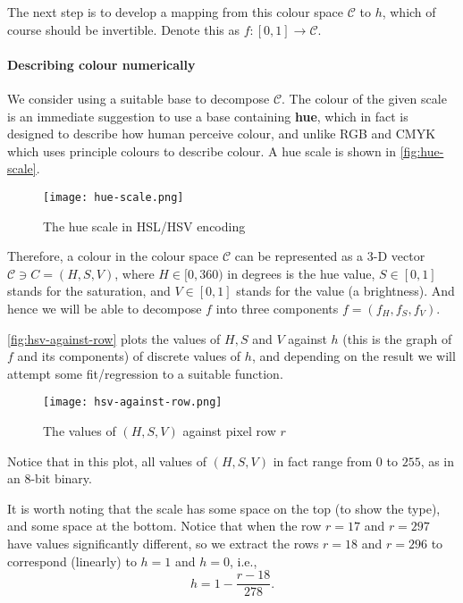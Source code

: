 The next step is to develop a mapping from this colour space \(\mathcal{C}\) to \(h\), which of course should be invertible. Denote this as \(f: [0, 1] \to \mathcal{C}\).

\paragraph{Describing colour numerically}

We consider using a suitable base to decompose \(\mathcal{C}\). The colour of the given scale is an immediate suggestion to use a base containing \textbf{hue}, which in fact is designed to describe how human perceive colour, and unlike RGB and CMYK which uses principle colours to describe colour. A hue scale is shown in \autoref{fig:hue-scale}.

\begin{figure}[htp]
    \centering
    \texttt{[image: hue-scale.png]}
    \caption{The hue scale in HSL/HSV encoding}
    \label{fig:hue-scale}
\end{figure}

Therefore, a colour in the colour space \(\mathcal{C}\) can be represented as a 3-D vector \(\mathcal{C} \ni C = (H, S, V)\), where \(H \in [0, 360)\) in degrees is the hue value, \(S \in [0, 1]\) stands for the saturation, and \(V \in [0, 1]\) stands for the value (a brightness). And hence we will be able to decompose \(f\) into three components \(f = \left(f_H, f_S, f_V\right)\).

\autoref{fig:hsv-against-row} plots the values of \(H, S\) and \(V\) against \(h\) (this is the graph of \(f\) and its components) of discrete values of \(h\), and depending on the result we will attempt some fit/regression to a suitable function.

\begin{figure}[htp]
    \centering
    \texttt{[image: hsv-against-row.png]}
    \caption{The values of \((H, S, V)\) against pixel row \(r\)}
    \label{fig:hsv-against-row}
\end{figure}

Notice that in this plot, all values of \((H, S, V)\) in fact range from \(0\) to \(255\), as in an 8-bit binary.

It is worth noting that the scale has some space on the top (to show the type), and some space at the bottom. Notice that when the row \(r = 17\) and \(r = 297\) have values significantly different, so we extract the rows \(r = 18\) and \(r = 296\) to correspond (linearly) to \(h = 1\) and \(h = 0\), i.e.,
\[
    h = 1 - \frac{r - 18}{278}.
\]

